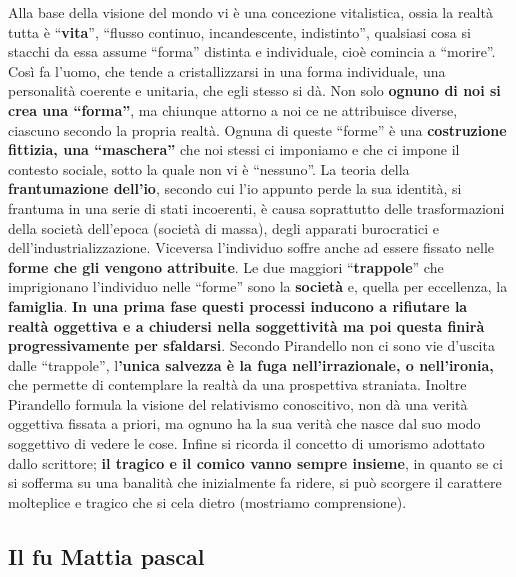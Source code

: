 \documentclass[10pt]{report}
\begin{document}
		Alla base della visione del mondo vi è una concezione vitalistica, ossia la realtà tutta è “\textbf{vita}”, “flusso continuo, incandescente, indistinto”, qualsiasi cosa si stacchi da essa assume “forma” distinta e individuale, cioè comincia a “morire”. 
		Così fa l’uomo, che tende a cristallizzarsi in una forma individuale, una personalità coerente e unitaria, che egli stesso si dà. Non solo\textbf{ ognuno di noi si crea una “forma”}, ma chiunque attorno a noi ce ne attribuisce diverse, ciascuno secondo la propria realtà.
		Ognuna di queste “forme” è una \textbf{costruzione fittizia, una “maschera”} che noi stessi ci imponiamo e che ci impone il contesto sociale, sotto la quale non vi è “nessuno”. 
		La teoria della \textbf{frantumazione dell’io}, secondo cui l’io appunto perde la sua identità, si frantuma in una serie di stati incoerenti, è causa soprattutto delle trasformazioni della società dell’epoca (società di massa), degli apparati burocratici e dell'industrializzazione. 
		Viceversa l’individuo soffre anche ad essere fissato nelle \textbf{forme che gli vengono attribuite}.
		Le due maggiori “\textbf{trappole}” che imprigionano l’individuo nelle “forme” sono la \textbf{società} e, quella per eccellenza, la \textbf{famiglia}. 
		\textbf{In una prima fase questi processi inducono a rifiutare la realtà oggettiva e a chiudersi nella soggettività ma poi questa finirà progressivamente per sfaldarsi}.
		Secondo Pirandello non ci sono vie d’uscita dalle “trappole”, l\textbf{’unica salvezza è la fuga nell’irrazionale, o nell’ironia,} che permette di contemplare la realtà da una prospettiva straniata.
		Inoltre Pirandello formula la visione del relativismo conoscitivo, non dà una verità oggettiva fissata a priori, ma ognuno ha la sua verità che nasce dal suo modo soggettivo di vedere le cose.
		Infine si ricorda il concetto di umorismo adottato dallo scrittore;\textbf{ il tragico e il comico vanno sempre insieme}, in quanto se ci si sofferma su una banalità che inizialmente fa ridere, si può scorgere il carattere molteplice e tragico che si cela dietro (mostriamo comprensione).
		\subsection{Il fu Mattia pascal}
\end{document}

